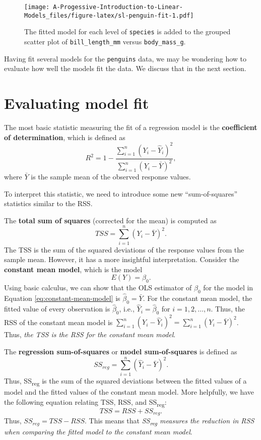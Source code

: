 \documentclass[
]{book}
\theoremstyle{definition}
\theoremstyle{definition}
\theoremstyle{definition}
\theoremstyle{definition}
\theoremstyle{remark}
\begin{document}
\begin{figure}
\centering
\texttt{[image: A-Progessive-Introduction-to-Linear-Models\_files/figure-latex/sl-penguin-fit-1.pdf]}
\caption{\label{fig:sl-penguin-fit}The fitted model for each level of \texttt{species} is added to the grouped scatter plot of \texttt{bill\_length\_mm} versus \texttt{body\_mass\_g}.}
\end{figure}

Having fit several models for the \texttt{penguins} data, we may be wondering how to evaluate how well the models fit the data. We discuss that in the next section.

\hypertarget{evaluating-model-fit}{%
\section{Evaluating model fit}\label{evaluating-model-fit}}

The most basic statistic measuring the fit of a regression model is the \textbf{coefficient of determination}, which is defined as
\[
R^2 = 1 - \frac{\sum_{i=1}^n (Y_i-\hat{Y}_i)^2}{\sum_{i=1}^n (Y_i-\bar{Y})^2},\label{eq:rsquared}
\]
where \(\bar{Y}\) is the sample mean of the observed response values.

To interpret this statistic, we need to introduce some new ``sum-of-squares'' statistics similar to the RSS.

The \textbf{total sum of squares} (corrected for the mean) is computed as
\[
TSS = \sum_{i=1}^n(Y_i-\bar{Y})^2. \label{eq:tss}
\]
The TSS is the sum of the squared deviations of the response values from the sample mean. However, it has a more insightful interpretation. Consider the \textbf{constant mean model}, which is the model
\[
E(Y)=\beta_0. \label{eq:constant-mean-model}
\]
Using basic calculus, we can show that the OLS estimator of \(\beta_0\) for the model in Equation \eqref{eq:constant-mean-model} is \(\hat{\beta}_0=\bar{Y}\). For the constant mean model, the fitted value of every observation is \(\hat{\beta}_0\), i.e., \(\hat{Y}_i=\hat{\beta}_0\) for \(i=1,2,\ldots,n\). Thus, the RSS of the constant mean model is \(\sum_{i=1}^n(Y_i-\hat{Y}_i)^2=\sum_{i=1}^n(Y_i-\bar{Y})^2\). Thus, \emph{the TSS is the RSS for the constant mean model}.

The \textbf{regression sum-of-squares} or \textbf{model sum-of-squares} is defined as
\[
SS_{reg} = \sum_{i=1}^n(\hat{Y}_i-\bar{Y})^2. \label{eq:ssreg}
\]
Thus, SS\textsubscript{reg} is the sum of the squared deviations between the fitted values of a model and the fitted values of the constant mean model. More helpfully, we have the following equation relating TSS, RSS, and SS\textsubscript{reg}:
\[
TSS = RSS + SS_{reg}.\label{eq:ss-equality}
\]
Thus, \(SS_{reg}=TSS-RSS\). This means that \emph{SS\textsubscript{reg} measures the reduction in RSS when comparing the fitted model to the constant mean model}.
\end{document}
